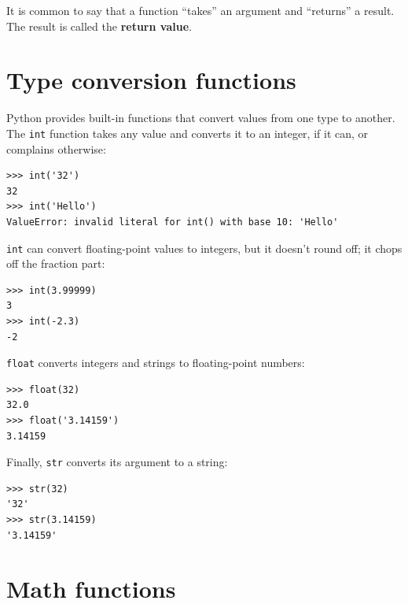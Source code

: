 \documentclass[10pt]{book}
\begin{document}
It is common to say that a function ``takes'' an argument and ``returns''
a result.  The result is called the {\bf return value}.



\section{Type conversion functions}



Python provides built-in functions that convert values
from one type to another.  The {\tt int} function takes any value and
converts it to an integer, if it can, or complains otherwise:


\beforeverb
\begin{verbatim}
>>> int('32')
32
>>> int('Hello')
ValueError: invalid literal for int() with base 10: 'Hello'
\end{verbatim}
\afterverb
%
{\tt int} can convert floating-point values to integers, but it
doesn't round off; it chops off the fraction part:

\beforeverb
\begin{verbatim}
>>> int(3.99999)
3
>>> int(-2.3)
-2
\end{verbatim}
\afterverb
%
{\tt float} converts integers and strings to floating-point
numbers:


\beforeverb
\begin{verbatim}
>>> float(32)
32.0
>>> float('3.14159')
3.14159
\end{verbatim}
\afterverb
%
Finally, {\tt str} converts its argument to a string:


\beforeverb
\begin{verbatim}
>>> str(32)
'32'
>>> str(3.14159)
'3.14159'
\end{verbatim}
\afterverb
%



\section{Math functions}
\end{document}
